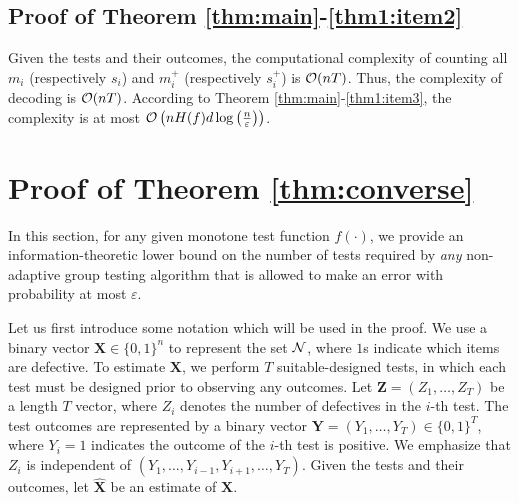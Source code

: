\documentclass[onecolumn,letterpaper]{IEEEtran}
\newcommand{\cN}{{\cal N}}
\newcommand{\cO}{{\cal O}}
\newcommand{\nt}{{m}}
\newcommand{\nti}{{\nt_{i}}}
\newcommand{\ntip}{{\nt_{i}^+}}
\newcommand{\mo}{{s}}
\newcommand{\moi}{{\mo_{i}}}
\newcommand{\moip}{{\mo_{i}^+}}
\newcommand{\cx}{{X}}
\newcommand{\cy}{{Y}}
\newcommand{\cxh}{{\hat{X}}}
\newcommand{\cA}{{Z}}
\newcommand{\fH}{{H(f)}}
\newcommand{\cc}[1]{\textcolor{blue}{#1}}
\begin{document}
\subsection{Proof of Theorem \ref{thm:main}-\ref{thm1:item2}} \label{sec:proof_thm_1_2}
Given the tests and their outcomes, the computational complexity of counting all $\nti$ (respectively $\moi$) and $\ntip$ (respectively $\moip$) is $\cO (nT)$. Thus, the complexity of decoding is $\cO(nT)$. According to Theorem \ref{thm:main}-\ref{thm1:item3}, the complexity is at most $\cO \left(n \fH d\log \left( \frac{n}{\varepsilon} \right) \right)$.%


\section{Proof of Theorem \ref{thm:converse}}
\label{sec:proof:converse}
In this section, for any given monotone test function $f(\cdot)$, we provide an information-theoretic lower bound on the number of tests required by \emph{any} non-adaptive group testing algorithm that is allowed to make an error with probability at most $\varepsilon$. %

Let us first introduce some notation which will be used in the proof. We use a binary vector $\boldsymbol{\cx}\in \{0,1\}^n$ to represent the set $\cN$, where $1$s indicate which items are defective.
To estimate $\boldsymbol{\cx}$, we perform $T$ suitable-designed tests, in which each test must be designed prior to observing any outcomes. Let $\boldsymbol{\cA}=(\cA_1,\dots,\cA_T)$ be a length $T$ vector, where $\cA_i$ denotes the number of defectives in the $i$-th test.
The test outcomes are represented by a binary vector $\boldsymbol{\cy}=(\cy_1,\dots,\cy_T)\in\{0,1\}^T$, where $\cy_i=1$ indicates the outcome of the $i$-th test is positive. We emphasize that $\cA_i$ is independent of $(\cy_1,\dots, \cy_{i-1},\cy_{i+1},\dots,\cy_{T})$. Given the tests and their outcomes, let $\boldsymbol{\cxh}$ be an estimate of $\boldsymbol{\cx}$.
\end{document}
